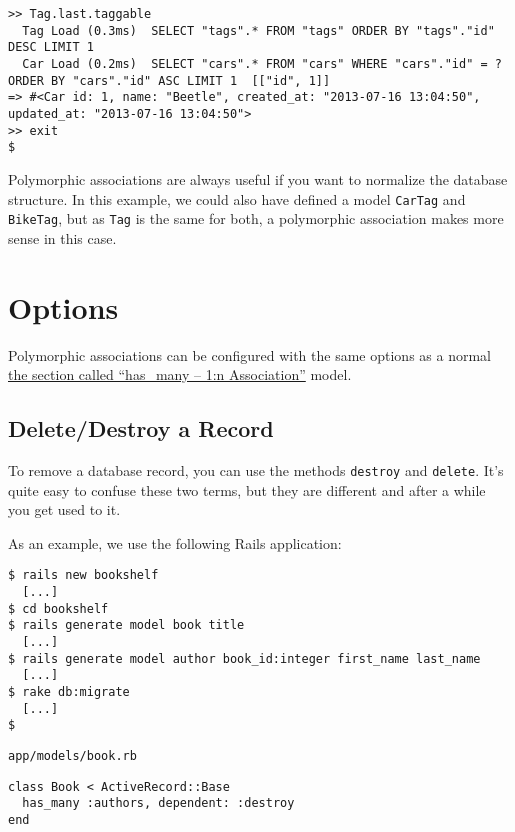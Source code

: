 \documentclass[a4paper]{book}
\newcounter{tab}[chapter]
\newcommand{\chap}[1]{\newpage\thispagestyle{empty}\chapter{#1}\label{chap:\thechapter}}
\begin{document}
\begin{shaded}\begin{verbatim}
>> Tag.last.taggable
  Tag Load (0.3ms)  SELECT "tags".* FROM "tags" ORDER BY "tags"."id" DESC LIMIT 1
  Car Load (0.2ms)  SELECT "cars".* FROM "cars" WHERE "cars"."id" = ? ORDER BY "cars"."id" ASC LIMIT 1  [["id", 1]]
=> #<Car id: 1, name: "Beetle", created_at: "2013-07-16 13:04:50", updated_at: "2013-07-16 13:04:50">
>> exit
$
\end{verbatim}\end{shaded}

Polymorphic associations are always useful if you want to normalize the database structure. In this example, we could also have defined a model \texttt{CarTag} and \texttt{BikeTag}, but as \texttt{Tag} is the same for both, a polymorphic association makes more sense in this case.

\chap{Options}\label{options-2}

Polymorphic associations can be configured with the same options as a normal \hyperref[activerecordux5fhasux5fmany]{the section called “has\_many -- 1:n Association”} model.

\section{Delete/Destroy a Record}\label{deletedestroy-a-record}

To remove a database record, you can use the methods \texttt{destroy} and \texttt{delete}. It's quite easy to confuse these two terms, but they are different and after a while you get used to it.

As an example, we use the following Rails application:

\begin{shaded}\begin{verbatim}
$ rails new bookshelf
  [...]
$ cd bookshelf
$ rails generate model book title
  [...]
$ rails generate model author book_id:integer first_name last_name
  [...]
$ rake db:migrate
  [...]
$
\end{verbatim}\end{shaded}

\texttt{app/models/book.rb}

\begin{shaded}\begin{verbatim}
class Book < ActiveRecord::Base
  has_many :authors, dependent: :destroy
end
\end{verbatim}\end{shaded}
\end{document}
